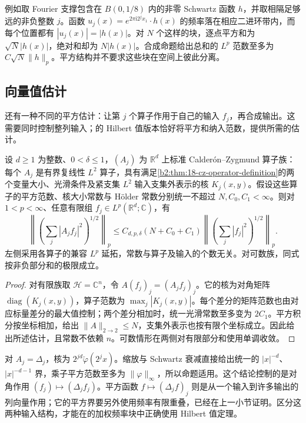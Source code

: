 例如取 Fourier 支撑包含在 \(B(0,1/8)\) 内的非零 Schwartz 函数 \(h\)，并取相隔足够远的非负整数 \(j\)。函数 \(u_j(x)=e^{2\pi\mathrm i2^j x_1}\cdot h(x)\) 的频率落在相应二进环带内，而每个位置都有 \(|u_j(x)|=|h(x)|\)。对 \(N\) 个这样的块，逐点平方和为 \(\sqrt N|h(x)|\)，绝对和却为 \(N|h(x)|\)。合成命题给出总和的 \(L^p\) 范数至多为 \(C\sqrt N\|h\|_p\)。平方结构并不要求这些块在空间上彼此分离。

\subsection{向量值估计}
\label{b2:subsec:190403}

还有一种不同的平方估计：让第 \(j\) 个算子作用于自己的输入 \(f_j\)，再合成输出。这需要同时控制整列输入；的 Hilbert 值版本恰好将平方和纳入范数，提供所需的估计。

\begin{proposition}[统一算子族的平方估计]\label{b2:prop:19-diagonal-square}
设 \(d\geq1\) 为整数、\(0<\delta\leq1\)，\((A_j)\) 为 \(\mathbb R^d\) 上标准 Calderón--Zygmund 算子族：每个 \(A_j\) 是有界复线性 \(L^2\) 算子，具有满足\cref{b2:thm:18-cz-operator-definition}的两个变量大小、光滑条件及紧支集 \(L^2\) 输入支集外表示的核 \(K_j(x,y)\)。假设这些算子的平方范数、核大小常数与 Hölder 常数分别统一不超过 \(N,C_0,C_1<\infty\)。则对 \(1<p<\infty\)、任意有限组 \(f_j\in L^p(\mathbb R^d;\mathbb C)\)，有
\[
 \left\|\left(\sum_j|A_jf_j|^2\right)^{1/2}\right\|_p
 \leq C_{d,p,\delta}(N+C_0+C_1)
       \left\|\left(\sum_j|f_j|^2\right)^{1/2}\right\|_p.
\]
左侧采用各算子的兼容 \(L^p\) 延拓，常数与算子及输入的个数无关。对可数族，同式按非负部分和的极限成立。
\end{proposition}
\begin{proof}
对有限族取 \(\mathcal H=\mathbb C^n\)，令 \(A(f_j)_j=(A_jf_j)_j\)。它的核为对角矩阵 \(\operatorname{diag}(K_j(x,y))\)，算子范数为 \(\max_j|K_j(x,y)|\)。每个差分的矩阵范数也由对应标量差分的最大值控制；两个差分相加时，统一光滑常数至多变为 \(2C_1\)。平方积分按坐标相加，给出 \(\|A\|_{2\to2}\leq N\)，支集外表示也按有限个坐标成立。因此给出所述估计，且常数不依赖 \(n\)。可数情形在两侧对有限部分和使用单调收敛。
\end{proof}

对 \(A_j=\Delta_j\)，核为 \(2^{jd}\check\varphi(2^jx)\)。缩放与 Schwartz 衰减直接给出统一的 \(|x|^{-d}\)、\(|x|^{-d-1}\) 界，乘子平方范数至多为 \(\|\varphi\|_\infty\)，所以命题适用。这个结论控制的是对角作用 \((f_j)\mapsto(\Delta_jf_j)\)。平方函数 \(f\mapsto(\Delta_jf)_j\) 则是从一个输入到许多输出的列向量作用；它的平方界要另外使用频率有限重叠，已经在上一小节证明。区分这两种输入结构，才能在的加权频率块中正确使用 Hilbert 值定理。

